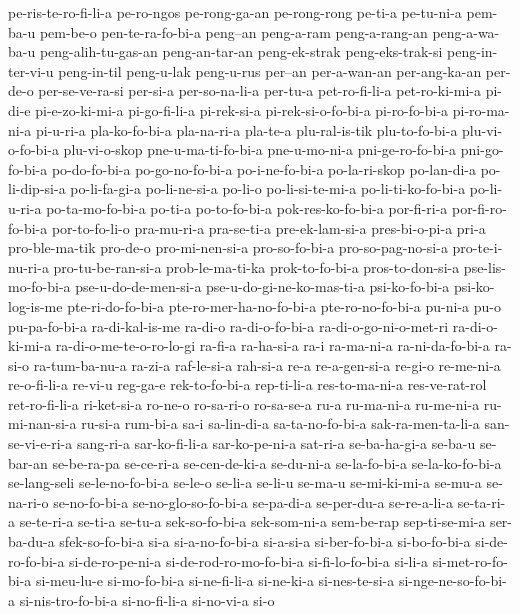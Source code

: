 {pe-ris-te-ro-fi-li-a pe-ro-ngos pe-rong-ga-an pe-rong-rong pe-ti-a
pe-tu-ni-a pem-ba-u pem-be-o pen-te-ra-fo-bi-a peng--an peng-a-ram
peng-a-rang-an peng-a-wa-ba-u peng-alih-tu-gas-an peng-an-tar-an
peng-ek-strak peng-eks-trak-si peng-in-ter-vi-u peng-in-til peng-u-lak
peng-u-rus per--an per-a-wan-an per-ang-ka-an per-de-o per-se-ve-ra-si
per-si-a per-so-na-li-a per-tu-a pet-ro-fi-li-a pet-ro-ki-mi-a pi-di-e
pi-e-zo-ki-mi-a pi-go-fi-li-a pi-rek-si-a pi-rek-si-o-fo-bi-a
pi-ro-fo-bi-a pi-ro-ma-ni-a pi-u-ri-a pla-ko-fo-bi-a pla-na-ri-a pla-te-a
plu-ral-is-tik plu-to-fo-bi-a plu-vi-o-fo-bi-a plu-vi-o-skop
pne-u-ma-ti-fo-bi-a pne-u-mo-ni-a pni-ge-ro-fo-bi-a pni-go-fo-bi-a
po-do-fo-bi-a po-go-no-fo-bi-a po-i-ne-fo-bi-a po-la-ri-skop po-lan-di-a
po-li-dip-si-a po-li-fa-gi-a po-li-ne-si-a po-li-o po-li-si-te-mi-a
po-li-ti-ko-fo-bi-a po-li-u-ri-a po-ta-mo-fo-bi-a po-ti-a po-to-fo-bi-a
pok-res-ko-fo-bi-a por-fi-ri-a por-fi-ro-fo-bi-a por-to-fo-li-o
pra-mu-ri-a pra-se-ti-a pre-ek-lam-si-a pres-bi-o-pi-a pri-a
pro-ble-ma-tik pro-de-o pro-mi-nen-si-a pro-so-fo-bi-a pro-so-pag-no-si-a
pro-te-i-nu-ri-a pro-tu-be-ran-si-a prob-le-ma-ti-ka prok-to-fo-bi-a
pros-to-don-si-a pse-lis-mo-fo-bi-a pse-u-do-de-men-si-a
pse-u-do-gi-ne-ko-mas-ti-a psi-ko-fo-bi-a psi-ko-log-is-me
pte-ri-do-fo-bi-a pte-ro-mer-ha-no-fo-bi-a pte-ro-no-fo-bi-a pu-ni-a pu-o
pu-pa-fo-bi-a ra-di-kal-is-me ra-di-o ra-di-o-fo-bi-a
ra-di-o-go-ni-o-met-ri ra-di-o-ki-mi-a ra-di-o-me-te-o-ro-lo-gi ra-fi-a
ra-ha-si-a ra-i ra-ma-ni-a ra-ni-da-fo-bi-a ra-si-o ra-tum-ba-nu-a ra-zi-a
raf-le-si-a rah-si-a re-a re-a-gen-si-a re-gi-o re-me-ni-a re-o-fi-li-a
re-vi-u reg-ga-e rek-to-fo-bi-a rep-ti-li-a res-to-ma-ni-a res-ve-rat-rol
ret-ro-fi-li-a ri-ket-si-a ro-ne-o ro-sa-ri-o ro-sa-se-a ru-a ru-ma-ni-a
ru-me-ni-a ru-mi-nan-si-a ru-si-a rum-bi-a sa-i sa-lin-di-a
sa-ta-no-fo-bi-a sak-ra-men-ta-li-a san-se-vi-e-ri-a sang-ri-a
sar-ko-fi-li-a sar-ko-pe-ni-a sat-ri-a se-ba-ha-gi-a se-ba-u se-bar-an
se-be-ra-pa se-ce-ri-a se-cen-de-ki-a se-du-ni-a se-la-fo-bi-a
se-la-ko-fo-bi-a se-lang-seli se-le-no-fo-bi-a se-le-o se-li-a se-li-u
se-ma-u se-mi-ki-mi-a se-mu-a se-na-ri-o se-no-fo-bi-a
se-no-glo-so-fo-bi-a se-pa-di-a se-per-du-a se-re-a-li-a se-ta-ri-a
se-te-ri-a se-ti-a se-tu-a sek-so-fo-bi-a sek-som-ni-a sem-be-rap
sep-ti-se-mi-a ser-ba-du-a sfek-so-fo-bi-a si-a si-a-no-fo-bi-a si-a-si-a
si-ber-fo-bi-a si-bo-fo-bi-a si-de-ro-fo-bi-a si-de-ro-pe-ni-a
si-de-rod-ro-mo-fo-bi-a si-fi-lo-fo-bi-a si-li-a si-met-ro-fo-bi-a
si-meu-lu-e si-mo-fo-bi-a si-ne-fi-li-a si-ne-ki-a si-nes-te-si-a
si-nge-ne-so-fo-bi-a si-nis-tro-fo-bi-a si-no-fi-li-a si-no-vi-a si-o
}
